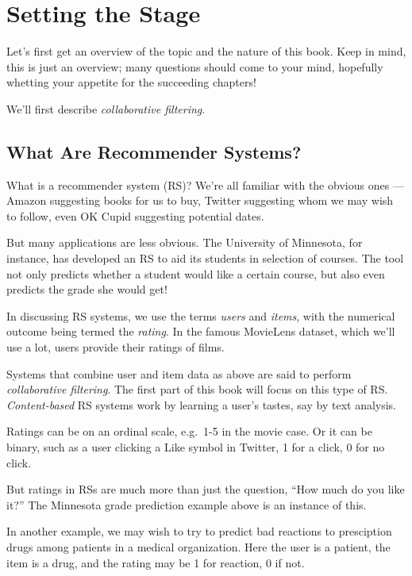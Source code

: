 \chapter{Setting the Stage}  
\label{chap:prologue} 

Let's first get an overview of the topic and the nature of this book.
Keep in mind, this is just an overview; many questions should come to
your mind, hopefully whetting your appetite for the succeeding chapters!

We'll first describe \textit{collaborative filtering}. 

\section{What Are Recommender Systems?}

What is a recommender system (RS)?  We're all familiar with the obvious
ones --- Amazon suggesting books for us to buy, Twitter suggesting whom
we may wish to follow, even OK Cupid suggesting potential dates.

But many applications are less obvious.  The University of Minnesota,
for instance, has developed an RS to aid its students in selection of
courses.  The tool not only predicts whether a student would like a
certain course, but also even predicts the grade she would get!

In discussing RS systems, we use the terms \textit{users} and
\textit{items}, with the numerical outcome being
termed the \textit{rating}.  In the famous MovieLens dataset, which
we'll use a lot, users provide their ratings of films.

Systems that combine user and item data as above are said to perform
\textit{collaborative filtering}.  The first part of this book will
focus on this type of RS.  \textit{Content-based} RS systems work by
learning a user's tastes, say by text analysis.

Ratings can be on an ordinal scale, e.g.\ 1-5 in the movie case.  Or it
can be binary, such as a user clicking a Like symbol in Twitter, 1 for a
click, 0 for no click.

But ratings in RSs are much more than just the question, ``How much do
you like it?''  The Minnesota grade prediction example above is an
instance of this.

In another example, we may wish to try to predict bad reactions to
presciption drugs among patients in a medical organization.  Here the
user is a patient, the item is a drug, and the rating may be 1 for
reaction, 0 if not.  

